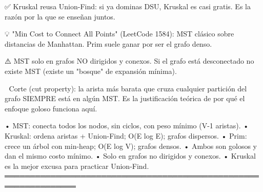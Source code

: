\begin{dsaentrevistas}

✅ Kruskal reusa Union-Find: si ya dominas DSU, Kruskal es casi gratis.
   Es la razón por la que se enseñan juntos.

💡 "Min Cost to Connect All Points" (LeetCode 1584): MST clásico sobre
   distancias de Manhattan. Prim suele ganar por ser el grafo denso.

⚠️ MST solo en grafos NO dirigidos y conexos. Si el grafo está
   desconectado no existe MST (existe un "bosque" de expansión mínima).

🔑 Corte (cut property): la arista más barata que cruza cualquier
   partición del grafo SIEMPRE está en algún MST. Es la justificación
   teórica de por qué el enfoque goloso funciona aquí.

\end{dsaentrevistas}

\begin{dsaresumen}

• MST: conecta todos los nodos, sin ciclos, con peso mínimo (V-1 aristas).
• Kruskal: ordena aristas + Union-Find; O(E log E); grafos dispersos.
• Prim: crece un árbol con min-heap; O(E log V); grafos densos.
• Ambos son golosos y dan el mismo costo mínimo.
• Solo en grafos no dirigidos y conexos.
• Kruskal es la mejor excusa para practicar Union-Find.
════════════════════════════════════════════════════════════════

\end{dsaresumen}
